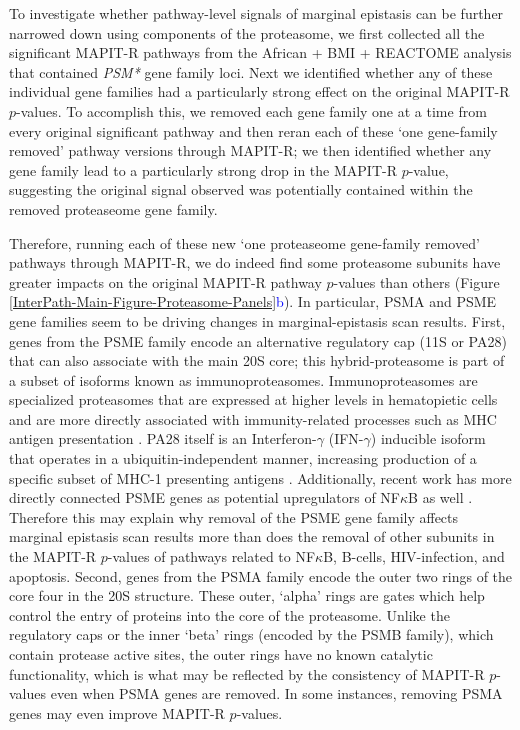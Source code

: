 \documentclass[12pt,a4paper]{article}
\begin{document}
To investigate whether pathway-level signals of marginal epistasis can be further narrowed down using components of the proteasome, we first collected all the significant MAPIT-R pathways from the African + BMI + REACTOME analysis that contained \emph{PSM*} gene family loci. Next we identified whether any of these individual gene families had a particularly strong effect on the original MAPIT-R $p$-values. To accomplish this, we removed each gene family one at a time from every original significant pathway and then reran each of these `one gene-family removed' pathway versions through MAPIT-R; we then identified whether any gene family lead to a particularly strong drop in the MAPIT-R $p$-value, suggesting the original signal observed was potentially contained within the removed proteaseome gene family.  

Therefore, running each of these new `one proteaseome gene-family removed' pathways through MAPIT-R, we do indeed find some proteasome subunits have greater impacts on the original MAPIT-R pathway $p$-values than others (Figure \ref{InterPath-Main-Figure-Proteasome-Panels}\textcolor{blue}{b}). In particular, PSMA and PSME gene families seem to be driving changes in marginal-epistasis scan results. First, genes from the PSME family encode an alternative regulatory cap (11S or PA28) that can also associate with the main 20S core; this hybrid-proteasome is part of a subset of isoforms known as immunoproteasomes. Immunoproteasomes are specialized proteasomes that are expressed at higher levels in hematopietic cells and are more directly associated with immunity-related processes such as MHC antigen presentation \citep{Ferrington2012,Basler2013,McCarthy2015}. PA28 itself is an Interferon-$\gamma$ (IFN-$\gamma$) inducible isoform that operates in a ubiquitin-independent manner, increasing production of a specific subset of MHC-1 presenting antigens \citep{Groettrup1996,de2011,Raule2014,Murata2018}. Additionally, recent work has more directly connected PSME genes as potential upregulators of NF$\kappa$B as well \citep{Sun2016,Mitchell2019}. Therefore this may explain why removal of the PSME gene family affects marginal epistasis scan results more than does the removal of other subunits in the MAPIT-R $p$-values of pathways related to NF$\kappa$B, B-cells, HIV-infection, and apoptosis. Second, genes from the PSMA family encode the outer two rings of the core four in the 20S structure. These outer, `alpha' rings are gates which help control the entry of proteins into the core of the proteasome. Unlike the regulatory caps or the inner `beta' rings (encoded by the PSMB family), which contain protease active sites, the outer rings have no known catalytic functionality, which is what may be reflected by the consistency of MAPIT-R $p$-values even when PSMA genes are removed. In some instances, removing PSMA genes may even improve MAPIT-R $p$-values.
\end{document}
